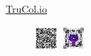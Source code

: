 %
\hspace{11.5cm}\href{https://www.TruCol.io}{TruCol.io}%

\begin{figure}[H]
    \vspace{-6cm}
    \hspace{13.5cm}
    \includegraphics[width=0.08\textwidth]{latex/Images/roadmap.jpg}
    \includegraphics[width=0.08\textwidth]{latex/Images/market_anlaysis.png}
\end{figure}



